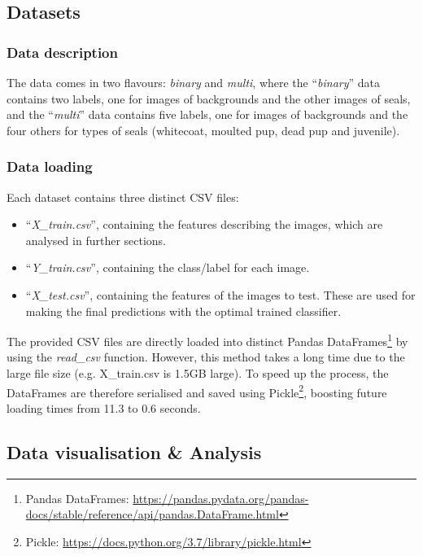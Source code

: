 \documentclass[letterpaper,12pt]{article}
\begin{document}
\subsection{Datasets}

\subsubsection{Data description}

The data comes in two flavours: \textit{binary} and \textit{multi}, where the ``\textit{binary}'' data contains two labels, one for images of backgrounds and the other images of seals, and  the ``\textit{multi}'' data contains five labels, one for images of backgrounds and the four others for types of seals (whitecoat, moulted pup, dead pup and juvenile).

\subsubsection{Data loading}
\label{sec:data-loading}

Each dataset contains three distinct CSV files:
\begin{itemize}
    \item ``\textit{X\_train.csv}'', containing the features describing the images, which are analysed in further sections.
    \item ``\textit{Y\_train.csv}'', containing the class/label for each image.
    \item ``\textit{X\_test.csv}'', containing the features of the images to test. These are used for making the final predictions with the optimal trained classifier.
\end{itemize}

The provided CSV files are directly loaded into distinct Pandas DataFrames\footnote{Pandas DataFrames: \url{https://pandas.pydata.org/pandas-docs/stable/reference/api/pandas.DataFrame.html}} by using the \textit{read\_csv} function. However, this method takes a long time due to the large file size (e.g. X\_train.csv is 1.5GB large). To speed up the process, the DataFrames are therefore serialised and saved using Pickle\footnote{Pickle: \url{https://docs.python.org/3.7/library/pickle.html}}, boosting future loading times from 11.3 to 0.6 seconds.


\subsection{Data visualisation \& Analysis}
\end{document}
